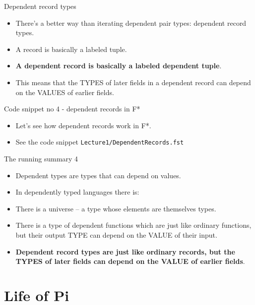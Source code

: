 \documentclass{beamer}
\newcommand{\m}[1]{\texttt{#1}}
\begin{document}
\begin{frame}{Dependent record types}
\begin{itemize}
	\item There's a better way than iterating dependent pair types: dependent record types.
	\item A record is basically a labeled tuple.
	\item \textbf{A dependent record is basically a labeled dependent tuple}.
	\item This means that the TYPES of later fields in a dependent record can depend on the VALUES of earlier fields.
\end{itemize}
\end{frame}

\begin{frame}{Code snippet no 4 - dependent records in F*}
\begin{itemize}
	\item Let's see how dependent records work in F*.
	\item See the code snippet \m{Lecture1/DependentRecords.fst}
\end{itemize}
\end{frame}

\begin{frame}{The running summary 4}
\begin{itemize}
	\item Dependent types are types that can depend on values.
	\item In dependently typed languages there is:
	\item There is a universe -- a type whose elements are themselves types.
	\item There is a type of dependent functions which are just like ordinary functions, but their output TYPE can depend on the VALUE of their input.
	\item \textbf{Dependent record types are just like ordinary records, but the TYPES of later fields can depend on the VALUE of earlier fields}.
\end{itemize}
\end{frame}

\section{Life of Pi}
\end{document}
